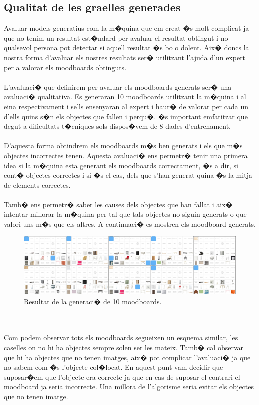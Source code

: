 \documentclass[12pt,a4paper,openright,oneside]{article}
\numberwithin{equation}{section}
\theoremstyle{definition}
\begin{document}
\subsection{Qualitat de les graelles generades}
Avaluar models generatius com la m�quina que em creat �s molt complicat ja que no tenim un resultat est�ndard per avaluar el resultat obtingut i no qualsevol persona pot detectar si aquell resultat �s bo o dolent. Aix� doncs la nostra forma d'avaluar els nostres resultats ser� utilitzant l'ajuda d'un expert per a valorar els moodboards obtinguts. \\\\
L'avaluaci� que definirem per avaluar els moodboards generats ser� una avaluaci� qualitativa. Es generaran 10 moodboards utilitzant la m�quina i al eina respectivament i se'ls ensenyaran al expert i haur� de valorar per cada un d'ells quins s�n els objectes que fallen i perqu�. �s important emfatitzar que degut a dificultats t�cniques sols dispos�vem de 8 dades d'entrenament.\\\\
D'aquesta forma obtindrem els moodboards m�s ben generats i els que m�s objectes incorrectes tenen. Aquesta avaluaci� ens permetr� tenir una primera idea si la m�quina esta generant els moodboards correctament, �s a dir, si cont� objectes correctes i si �s el cas, dels que s'han generat quina �s la mitja de elements correctes.\\\\
Tamb� ens permetr� saber les causes dels objectes que han fallat i aix� intentar millorar la m�quina per tal que tals objectes no siguin generats o que valori uns m�s que els altres. A continuaci� es mostren els moodboard generats.
\begin{figure}[h!]
\begin{center}
\includegraphics[width=\textwidth,height=\textheight,keepaspectratio]{merge}
\caption{Resultat de la generaci� de 10 moodboards.}
\end{center}
\end{figure}
\\\\
Com podem observar tots els moodboards segueixen un esquema similar, les caselles on no hi ha objectes sempre solen ser les mateix. Tamb� cal observar que hi ha objectes que no tenen imatges, aix� pot complicar l'avaluaci� ja que no sabem com �s l'objecte col�locat. En aquest punt vam decidir que suposar�em que l'objecte era correcte ja que en cas de suposar el contrari el moodboard ja seria incorrecte. Una millora de l'algorisme seria evitar els objectes que no tenen imatge.\\\\
\end{document}
